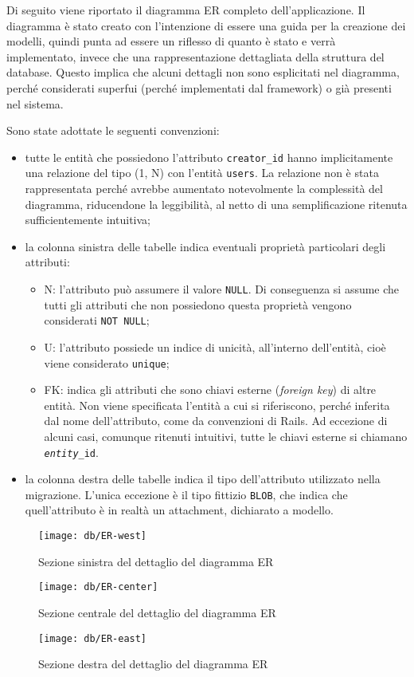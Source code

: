 Di seguito viene riportato il diagramma ER completo dell'applicazione. Il diagramma è stato creato con l'intenzione di essere una guida per la creazione dei modelli, quindi punta ad essere un riflesso di quanto è stato e verrà implementato, invece che una rappresentazione dettagliata della struttura del database. Questo implica che alcuni dettagli non sono esplicitati nel diagramma, perché considerati superfui (perché implementati dal framework) o già presenti nel sistema.

\noindent Sono state adottate le seguenti convenzioni:
\begin{itemize}
	\item tutte le entità che possiedono l'attributo \verb|creator_id| hanno implicitamente una relazione del tipo (1, N) con l'entità \verb|users|. La relazione non è stata rappresentata perché avrebbe aumentato notevolmente la complessità del diagramma, riducendone la leggibilità, al netto di una semplificazione ritenuta sufficientemente intuitiva;
	\item la colonna sinistra delle tabelle indica eventuali proprietà particolari degli attributi:
	\begin{itemize}
		\item N: l'attributo può assumere il valore \verb|NULL|. Di conseguenza si assume che tutti gli attributi che non possiedono questa proprietà vengono considerati \verb|NOT NULL|;
		\item U: l'attributo possiede un indice di unicità, all'interno dell'entità, cioè viene considerato \verb|unique|;
		\item FK: indica gli attributi che sono chiavi esterne (\emph{foreign key}) di altre entità. Non viene specificata l'entità a cui si riferiscono, perché inferita dal nome dell'attributo, come da convenzioni di Rails. Ad eccezione di alcuni casi, comunque ritenuti intuitivi, tutte le chiavi esterne si chiamano \texttt{\emph{entity}\_id}.
	\end{itemize}
	\item la colonna destra delle tabelle indica il tipo dell'attributo utilizzato nella migrazione. L'unica eccezione è il tipo fittizio \verb|BLOB|, che indica che quell'attributo è in realtà un attachment, dichiarato a modello.
\end{itemize}

\begin{figure}[b]
	\texttt{[image: db/ER-west]}
	\caption{Sezione sinistra del dettaglio del diagramma ER}
	\label{fig:er-west}
\end{figure}

\begin{figure}[b]
	\texttt{[image: db/ER-center]}
	\caption{Sezione centrale del dettaglio del diagramma ER}
	\label{fig:er-center}
\end{figure}

\begin{figure}[b]
	\texttt{[image: db/ER-east]}
	\caption{Sezione destra del dettaglio del diagramma ER}
	\label{fig:er-east}
\end{figure}
